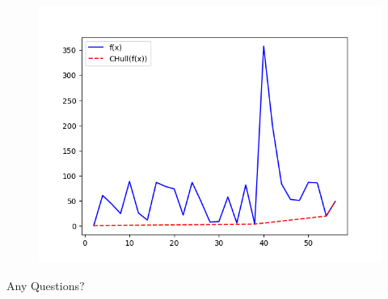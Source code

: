 \documentclass{beamer}
\begin{document}
\begin{frame}
	\begin{figure}
		\center
		\includegraphics[scale=0.6]{../Figures/Figure_5.png}
	\end{figure}
\end{frame}

\begin{frame}
\Huge{\centerline{Any Questions?}}
\end{frame}
\end{document}
